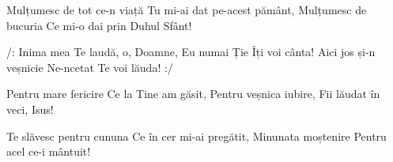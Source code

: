 \beginverse
Mulțumesc de tot ce-n viață
Tu mi-ai dat pe-acest pământ,
Mulțumesc de bucuria
Ce mi-o dai prin Duhul Sfânt!
\endverse

\beginchorus
/: Inima mea Te laudă, o, Doamne,
Eu numai Ție Îți voi cânta!
Aici jos și-n veșnicie
Ne-ncetat Te voi lăuda! :/
\endchorus

\beginverse
Pentru mare fericire
Ce la Tine am găsit,
Pentru veșnica iubire,
Fii lăudat în veci, Isus!
\endverse

\beginverse
Te slăvesc pentru cununa
Ce în cer mi-ai pregătit,
Minunata moștenire
Pentru acel ce-i mântuit!
\endverse
\endsong